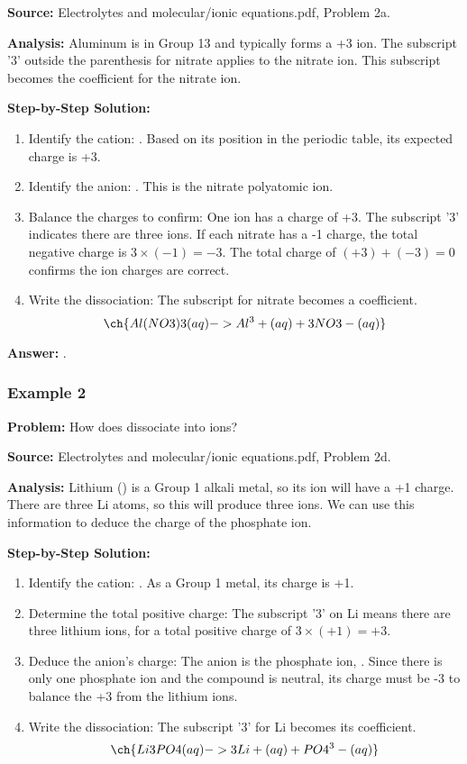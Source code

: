 \documentclass{article}
\begin{document}
\textbf{Source:} Electrolytes and molecular/ionic equations.pdf, Problem 2a.

\textbf{Analysis:} Aluminum is in Group 13 and typically forms a +3 ion. The subscript '3' outside the parenthesis for nitrate applies to the nitrate ion. This subscript becomes the coefficient for the nitrate ion.

\textbf{Step-by-Step Solution:}
\begin{enumerate}
    \item Identify the cation: . Based on its position in the periodic table, its expected charge is +3.
    \item Identify the anion: . This is the nitrate polyatomic ion.
    \item Balance the charges to confirm: One  ion has a charge of +3. The subscript '3' indicates there are three  ions. If each nitrate has a -1 charge, the total negative charge is $3 \times (-1) = -3$. The total charge of $(+3) + (-3) = 0$ confirms the ion charges are correct.
    \item Write the dissociation: The subscript for nitrate becomes a coefficient.
    \[ \ch{Al(NO3)3(aq) -> Al^3+(aq) + 3NO3-(aq)} \]
\end{enumerate}

\textbf{Answer:} \textbf{}.

\subsubsection{Example 2}
\textbf{Problem:} How does  dissociate into ions?

\textbf{Source:} Electrolytes and molecular/ionic equations.pdf, Problem 2d.

\textbf{Analysis:} Lithium () is a Group 1 alkali metal, so its ion will have a +1 charge. There are three Li atoms, so this will produce three  ions. We can use this information to deduce the charge of the phosphate ion.

\textbf{Step-by-Step Solution:}
\begin{enumerate}
    \item Identify the cation: . As a Group 1 metal, its charge is +1.
    \item Determine the total positive charge: The subscript '3' on Li means there are three lithium ions, for a total positive charge of $3 \times (+1) = +3$.
    \item Deduce the anion's charge: The anion is the phosphate ion, . Since there is only one phosphate ion and the compound is neutral, its charge must be -3 to balance the +3 from the lithium ions.
    \item Write the dissociation: The subscript '3' for Li becomes its coefficient.
    \[ \ch{Li3PO4(aq) -> 3Li+(aq) + PO4^3-(aq)} \]
\end{enumerate}
\end{document}
